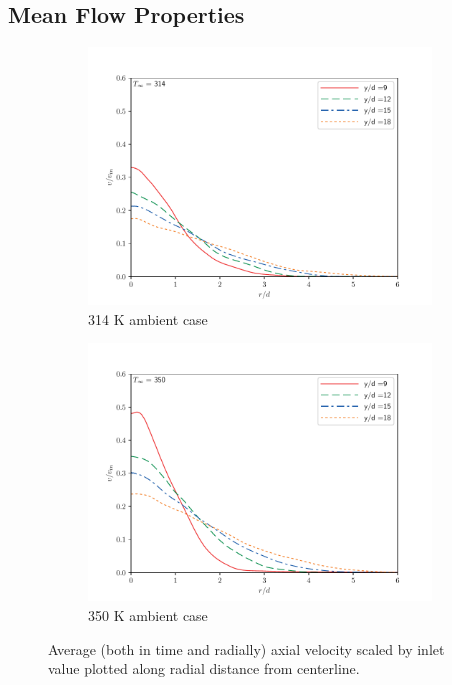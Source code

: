 \subsection{Mean Flow Properties}

\begin{figure}[H]
\begin{center}
\begin{subfigure}{0.45\textwidth}
	\includegraphics[scale=.45]{figures/Plots/radial/slices_3/314_ambient/ur_u_in_vs_r_d.pdf}
	\caption{314 K ambient case} \label{noniso_v_vin_r_d_1}
\end{subfigure}
\begin{subfigure}{0.45\textwidth}
	\includegraphics[scale=.45]{figures/Plots/radial/slices_3/350_ambient/ur_u_in_vs_r_d.pdf}
	\caption{350 K ambient case} \label{noniso_v_vin_r_d_2}
\end{subfigure}
\caption{Average (both in time and radially) axial velocity scaled by inlet value plotted along radial distance from centerline.}
\label{noniso_v_vin_r_d_features}
\end{center}
\end{figure}


